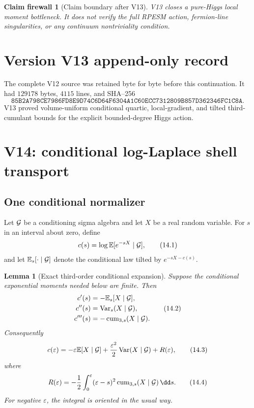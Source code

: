 \documentclass[11pt]{article}
\newtheorem{lemma}[theorem]{Lemma}
\newtheorem{firewall}[theorem]{Claim firewall}
\theoremstyle{remark}
\begin{document}
\begin{firewall}[Claim boundary after V13]
\label{fire:v17v13}
V13 closes a pure-Higgs local moment bottleneck.  It does not verify
the full RPESM action, fermion-line singularities, or any continuum
nontriviality condition.
\end{firewall}

\section*{Version V13 append-only record}
The complete V12 source was retained byte for byte before this
continuation.  It had \(129178\) bytes, \(4115\) lines, and SHA--256
\[
 \texttt{85B2A798CE7986FD8E9D74C6D64F6304A1C60ECC7312809B857D362346FC1C8A}.
\]
V13 proved volume-uniform conditional quartic, local-gradient, and
tilted third-cumulant bounds for the explicit bounded-degree Higgs
action.


\section{V14: conditional log-Laplace shell transport}
\label{sec:v17v14}

\subsection{One conditional normalizer}

Let \({\cal G}\) be a conditioning sigma algebra and let \(X\) be a
real random variable.  For \(s\) in an interval about zero, define
\[
 c(s)=\log\mathbb E[e^{-sX}\mid{\cal G}],           \tag{14.1}
\]
and let \(\mathbb E_s[\cdot\mid{\cal G}]\) denote the conditional
law tilted by \(e^{-sX-c(s)}\).

\begin{lemma}[Exact third-order conditional expansion]
\label{lem:v17v14-loglaplace}
Suppose the conditional exponential moments needed below are
finite.  Then
\[
\begin{aligned}
 c'(s)&=-\mathbb E_s[X\mid{\cal G}],\\
 c''(s)&=\operatorname{Var}_s(X\mid{\cal G}),\\
 c'''(s)&=-\operatorname{cum}_{3,s}(X\mid{\cal G}).
\end{aligned}                                                       \tag{14.2}
\]
Consequently
\[
 c(\varepsilon)
 =-\varepsilon\mathbb E[X\mid{\cal G}]
 +\frac{\varepsilon^2}{2}
   \operatorname{Var}(X\mid{\cal G})
 +R(\varepsilon),                                  \tag{14.3}
\]
where
\[
 R(\varepsilon)
 =-\frac12\int_0^\varepsilon
 (\varepsilon-s)^2
 \operatorname{cum}_{3,s}(X\mid{\cal G})\,\dd s.   \tag{14.4}
\]
For negative \(\varepsilon\), the integral is oriented in the usual
way.
\end{lemma}
\end{document}
